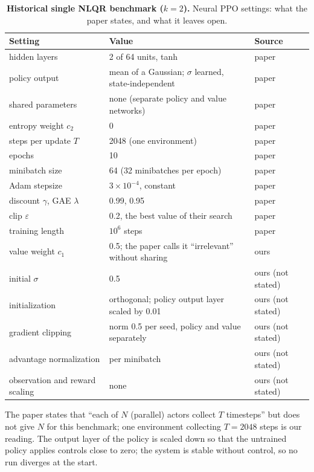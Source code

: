 \documentclass[11pt]{article}
\begin{document}
\begin{table}[H]
  \centering
  \small
  \begin{tabular}{@{}l p{6.2cm} l@{}}
    \toprule
    Setting & Value & Source \\
    \midrule
    hidden layers & 2 of 64 units, tanh & paper \\
    policy output & mean of a Gaussian; $\sigma$ learned, state-independent & paper \\
    shared parameters & none (separate policy and value networks) & paper \\
    entropy weight $c_2$ & 0 & paper \\
    steps per update $T$ & 2048 (one environment) & paper \\
    epochs & 10 & paper \\
    minibatch size & 64 (32 minibatches per epoch) & paper \\
    Adam stepsize & $3 \times 10^{-4}$, constant & paper \\
    discount $\gamma$, GAE $\lambda$ & 0.99, 0.95 & paper \\
    clip $\varepsilon$ & 0.2, the best value of their search & paper \\
    training length & $10^6$ steps & paper \\
    \midrule
    value weight $c_1$ & 0.5; the paper calls it ``irrelevant'' without sharing & ours \\
    initial $\sigma$ & 0.5 & ours (not stated) \\
    initialization & orthogonal; policy output layer scaled by 0.01 & ours (not stated) \\
    gradient clipping & norm 0.5 per seed, policy and value separately & ours (not stated) \\
    advantage normalization & per minibatch & ours (not stated) \\
    observation and reward scaling & none & ours (not stated) \\
    \bottomrule
  \end{tabular}
  \caption{\textbf{Historical single NLQR benchmark ($k=2$).} Neural PPO settings: what the paper states, and what it leaves open.}
\end{table}

The paper states that ``each of $N$ (parallel) actors collect $T$ timesteps'' but does not give $N$
for this benchmark; one environment collecting $T = 2048$ steps is our reading. The output layer of
the policy is scaled down so that the untrained policy applies controls close to zero; the system is
stable without control, so no run diverges at the start.
\end{document}
